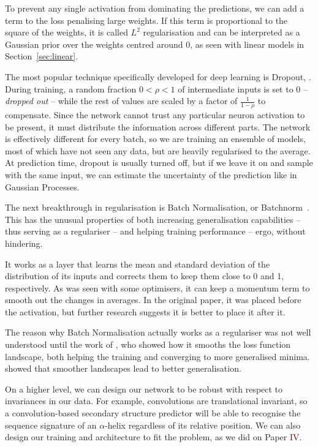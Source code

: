 To prevent any single activation from 
dominating the predictions, we can add a term to the loss penalising large weights.
If this term is proportional to the square of the weights, it is called $L^2$ regularisation and can be interpreted as a Gaussian prior over the weights centred around $0$, as seen with linear models in Section~\ref{sec:linear}.

The most popular technique  
specifically developed for deep learning is Dropout, \citep{dropout}.
During training, a random fraction $0 < \rho < 1$ of intermediate inputs is set to $0$ -- \emph{dropped out} --  while the rest of values are scaled by a factor of $\frac{1}{1-\rho}$ to compensate.
Since the network cannot trust any particular neuron activation to be present, it must distribute the information across different parts.
The network is effectively different for every batch, so we are training an ensemble of models, most of which have not seen any data, but are heavily regularised to the average.
At prediction time, dropout is usually turned off, but if we leave it on and sample with the same input, we can estimate the uncertainty of the prediction like in Gaussian Processes.

The next breakthrough in regularisation is Batch Normalisation, 
or Batchnorm~\citep{bn}.
This has the unusual properties of both increasing generalisation capabilities -- thus serving as a regulariser -- and helping training performance -- ergo, without hindering.

It works as a layer that learns the mean and standard deviation of the distribution of its inputs and corrects them to keep them close to 0 and 1, respectively.
As was seen with some optimisers, it can keep a momentum term to smooth out the changes in averages.
In the original paper, it was placed before the activation, but further research suggests it is better to place it after it.

The reason why Batch Normalisation actually works as a regulariser was not well understood until the work of \citet{how_bn_works}, who showed how it smooths the loss function landscape, both helping the training and converging to more generalised minima.
\citet{large_batch} showed that smoother landscapes lead to better generalisation.

On a higher level,
we can design our network to be robust with respect to invariances in our data.
For example, convolutions are translational invariant, so a convolution-based secondary structure predictor will be able to recognise the sequence signature of an $\alpha$-helix regardless of its relative position.
We can also  design our training and architecture to fit the problem, as we did on Paper \textcolor{Maroon}{IV}.

